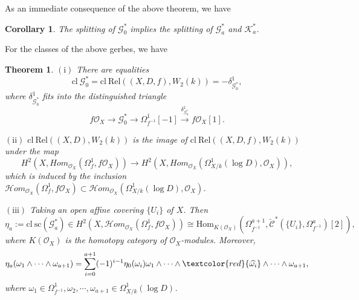 \documentclass[12pt, a4paper]{article}
\newtheorem{theorem}{Theorem}[section]
\newtheorem{corollary}{Corollary}[section]
\begin{document}
As an immediate consequence of the above theorem, we have
\begin{corollary}
The splitting of $\mathcal G^*_0$ implies the splitting of $\mathcal G^*_a$ and $\mathcal K^*_a$.
\end{corollary}

For the classes of the above gerbes, we have 

\begin{theorem}
$\mathrm{(i)}$ There are equalities 
 $$\mathrm{cl}~\mathcal G^*_0=\mathrm{cl}~\mathrm{Rel}((X,D,f),W_2(k))=-\delta^1_{\mathcal G^*_0},$$
where $\delta^1_{\mathcal G^*_0}$ fits into the distinguished triangle 
$$
f\mathcal O_X\to\mathcal G^*_0\to\Omega^1_{f^{-1}}[-1]\xrightarrow{\delta^1_{\mathcal G^*_0}}f\mathcal O_X[1].
$$

$\mathrm{(ii)}$ $\mathrm{cl}~\mathrm{Rel}((X,D),W_2(k))$ is the image of $\mathrm{cl}~\mathrm{Rel}((X,D,f),W_2(k))$ under the map
$$
H^2(X,Hom_{\mathcal O_X}(\Omega^1_f,f\mathcal O_X))\to H^2(X,Hom_{\mathcal O_X}(\Omega^1_{X/k}(\log D),\mathcal O_X)),
$$
which is induced by the inclusion $\mathcal Hom_{\mathcal O_X}(\Omega^1_f,f\mathcal O_X)\subset\mathcal Hom_{\mathcal O_X}(\Omega^1_{X/k}(\log D),\mathcal O_X)$.

$\mathrm{(iii)}$ Taking an open affine covering $\{U_i\}$ of $X$. Then
$$
\eta_a:=\mathrm{cl}~\mathrm{sc}(\mathcal G^*_a)\in H^2(X,\mathcal Hom_{\mathcal O_X}(\Omega^1_f,f\mathcal O_X))\cong\mathrm{Hom}_{K(\mathcal O_X)}(\Omega^{a+1}_{f^{-1}},\mathcal {\check C}^*(\{U_i\},\Omega^a_{f^{-1}})[2]),
$$
where $K(\mathcal O_X)$ is the homotopy category of $\mathcal O_X$-modules. Moreover,  
$$
\eta_a(\omega_1\wedge\cdots\wedge\omega_{a+1})=\sum_{i=0}^{a+1}(-1)^{i-1}\eta_0(\omega_i)\omega_1\wedge\cdots\wedge\textcolor{red}{\widehat{\omega_i}}\wedge\cdots\wedge\omega_{a+1},
$$
where $\omega_1\in\Omega^1_{f^{-1}},\omega_2,\cdots,\omega_{a+1}\in\Omega^1_{X/k}(\log D)$.
\end{theorem}
\fi
\end{document}
